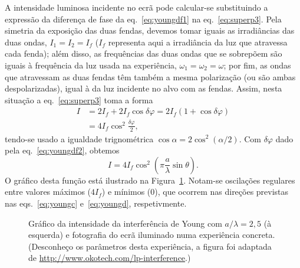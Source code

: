 A intensidade luminosa incidente no ecrã pode calcular-se substituindo a
expressão da diferença de fase da eq.~\eqref{eq:youngdf1} na
eq.~\eqref{eq:superp3}. Pela simetria da exposição das duas fendas, devemos
tomar iguais as irradiâncias das duas ondas, $I_1=I_2=I_f$ ($I_f$ representa
aqui a irradiância da luz que atravessa cada fenda); além disso, as frequências
das duas ondas que se sobrepõem são iguais à frequência da luz usada na
experiência, $\omega_1=\omega_2=\omega$; por fim, as ondas que atravessam as
duas fendas têm também a mesma polarização (ou são ambas despolarizadas), igual
à da luz incidente no alvo com as fendas. Assim, nesta situação a
eq.~\eqref{eq:superp3} toma a forma
\begin{align*}
I&=2I_f+2I_f\cos\delta\varphi=
  2I_f(1+\cos\delta\varphi)\\&=4I_f\cos^2\frac{\delta\varphi}{2},
\end{align*}
tendo-se usado a igualdade trignométrica $\cos\alpha=2\cos^2(\alpha/2)$. Com
$\delta\varphi$ dado pela eq.~\eqref{eq:youngdf2}, obtemos
\begin{equation}\label{eq:yngi}
I=4I_f\cos^2\left(\pi\frac{a}{\lambda}\sin\theta\right).
\end{equation}
O gráfico desta função está ilustrado na Figura~\ref{fig:yngint}. Notam-se
oscilações regulares entre valores máximos ($4I_f$) e mínimos (0), que ocorrem
nas direções previstas nas eqs.~\eqref{eq:youngc} e~\eqref{eq:youngd},
respetivmente.
\begin{figure}[htb]
  {\centering
  \par}
  \caption{\label{fig:yngint}Gráfico da intensidade da interferência de Young
    com $a/\lambda=2,5$ (à esquerda) e fotografia do ecrã iluminado numa
    experiência concreta. (Desconheço os parâmetros desta experiência, a figura
    foi adaptada de \protect\url{http://www.okotech.com/lp-interference}.)}
\end{figure}
